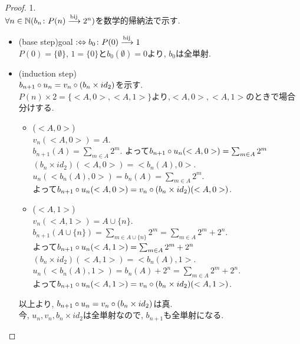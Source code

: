 \begin{proof} 1. \\
  $\forall n \in \mathbb{N} (b_n\colon P(n) \xrightarrow{\text{bij}} 2^n)$を数学的帰納法で示す.
  \begin{itemize}
    \item[]\hspace{-0.5cm} (base step)goal $:\Leftrightarrow b_0\colon P(0) \xrightarrow{\text{bij}} 1$\\
      $P(0) = \{\emptyset\}$,
      $1 = \{0\}$と$b_0(\emptyset) = 0$より,
      $b_0$は全単射.
    \item[]\hspace{-0.5cm} (induction step)\\
      $b_{n+1} \circ u_n = v_n \circ (b_n \times id_2)$を示す.\\
      $P(n) \times 2 = \{<A, 0>, <A,1>\}$より,$<A,0>,<A,1>$のときで場合分けする.
      \begin{itemize}
        \item[]\hspace{-0.5cm} ($<A, 0>$)\\
          $v_n(<A,0>) = A.$\\
          $b_{n+1}(A) = \sum _{m \in A} 2^m$.
          よって$b_{n+1} \circ u_n(<A,0>) = \sum _{m \in A} 2^m$\\
          $(b_n \times id_2)(<A,0>) = <b_n(A), 0>$.\\
          $u_n(<b_n(A), 0>) = b_n(A) = \sum _{m \in A} 2^m$.\\
          よって$b_{n+1} \circ u_n(<A,0>) = v_n \circ (b_n \times id_2)(<A,0>)$.
        \item[]\hspace{-0.5cm} ($<A, 1>$)\\
          $v_n(<A,1>) = A \cup \{n\}.$\\
          $b_{n+1}(A \cup \{n\}) = \sum _{m \in A \cup \{n\}} 2^m = \sum _{m \in A} 2^m + 2^n$.\\
          よって$b_{n+1} \circ u_n(<A,1>) = \sum _{m \in A} 2^m + 2^n$\\
          $(b_n \times id_2)(<A,1>) = <b_n(A), 1>$.\\
          $u_n(<b_n(A), 1>) = b_n(A) + 2^n = \sum _{m \in A} 2^m + 2^n$.\\
          よって$b_{n+1} \circ u_n(<A,1>) = v_n \circ (b_n \times id_2)(<A,1>)$.
      \end{itemize}
      以上より,
      $b_{n+1} \circ u_n = v_n \circ (b_n \times id_2)$は真.\\
      今,
      $u_n, v_n, b_n \times id_2$は全単射なので,
      $b_{n+1}$も全単射になる.
  \end{itemize}
\end{proof} 
